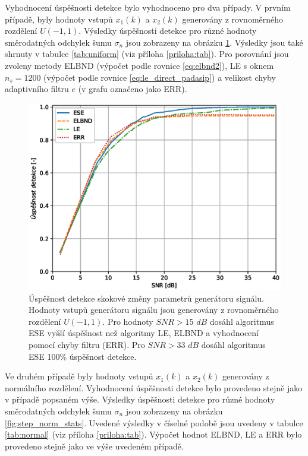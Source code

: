 Vyhodnocení úspěšnosti detekce bylo vyhodnoceno pro dva případy. V prvním případě, byly hodnoty vstupů $x_1(k)$ a $x_2(k)$ generovány z rovnoměrného rozdělení $U(-1,1)$. Výsledky úspěšnosti detekce pro různé hodnoty směrodatných odchylek šumu $\sigma_n$ jsou zobrazeny na obrázku \ref{fig:step_uni_stats}. Výsledky jsou také shrnuty v tabulce \ref{tab:uniform} (viz příloha \ref{priloha:tab}). Pro porovnání jsou zvoleny metody ELBND (výpočet podle rovnice \ref{eq:elbnd2}), LE s oknem $n_s=1200$ (výpočet podle rovnice \ref{eq:le_direct_padasip}) a velikost chyby adaptivního filtru $e$ (v grafu označeno jako ERR).

\begin{figure}[!ht]
    \centering
    \includegraphics[scale=0.66]{IMG/mdpi/stepuni_stats.eps}
    \caption{Úspěšnost detekce skokové změny parametrů generátoru signálu. Hodnoty vstupů generátoru signálu jsou generovány z rovnoměrného rozdělení $U(-1,1)$. 
Pro hodnoty $SNR > 15$ $dB$ dosáhl algoritmus ESE vyšší úspěšnost než algoritmy  LE, ELBND a vyhodnocení pomocí chyby filtru (ERR). Pro $SNR > 33$ $dB$ dosáhl algoritmus ESE 100\% úspěšnost detekce.}
    \label{fig:step_uni_stats}
\end{figure}
Ve druhém případě byly hodnoty vstupů $x_1(k)$ a $x_2(k)$ generovány z normálního rozdělení. Vyhodnocení úspěšnosti detekce bylo provedeno stejně jako v případě popsaném výše. Výsledky úspěšnosti detekce pro různé hodnoty směrodatných odchylek šumu $\sigma_n$ jsou zobrazeny na obrázku \ref{fig:step_norm_stats}. Uvedené výsledky v číselné podobě jsou uvedeny v tabulce \ref{tab:normal} (viz příloha \ref{priloha:tab}). Výpočet hodnot ELBND, LE a ERR bylo provedeno stejně jako ve výše uvedeném případě.

